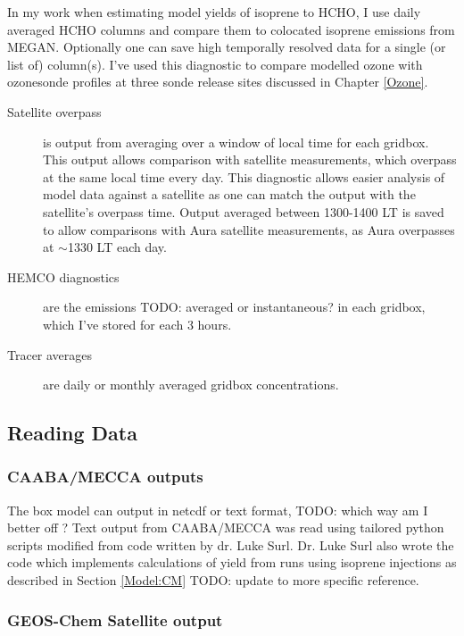     In my work when estimating model yields of isoprene to HCHO, I use daily averaged HCHO columns and compare them to colocated isoprene emissions from MEGAN.
    Optionally one can save high temporally resolved data for a single (or list of) column(s).
    I've used this diagnostic to compare modelled ozone with ozonesonde profiles at three sonde release sites discussed in Chapter \ref{Ozone}.
    
    
    \begin{description}
      \item[Satellite overpass]%
        is output from averaging over a window of local time for each gridbox. 
        This output allows comparison with satellite measurements, which overpass at the same local time every day.
        This diagnostic allows easier analysis of model data against a satellite as one can match the output with the satellite's overpass time.
        Output averaged between 1300-1400 LT is saved to allow comparisons with Aura satellite measurements, as Aura overpasses at $\sim$1330 LT each day.
      \item[HEMCO diagnostics]%
        are the emissions TODO: averaged or instantaneous? in each gridbox, which I've stored for each 3 hours.
      \item[Tracer averages]%
        are daily or monthly averaged gridbox concentrations.
      
    \end{description}
  
   
  \subsection{Reading Data}
    \subsubsection{CAABA/MECCA outputs}
      The box model can output in netcdf or text format, TODO: which way am I better off ? 
      Text output from CAABA/MECCA was read using tailored python scripts modified from code written by dr. Luke Surl.
      Dr. Luke Surl also wrote the code which implements calculations of yield from runs using isoprene injections as described in Section \ref{Model:CM} TODO: update to more specific reference.
      
    \subsubsection{GEOS-Chem Satellite output}
    
